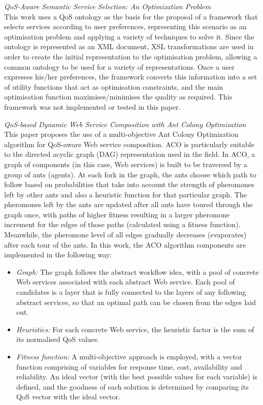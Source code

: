 \textit{QoS-Aware Semantic Service Selection: An Optimization Problem \cite{garcia2008qos}}\\
This work uses a QoS ontology as the basis for the proposal of a framework that selects services according to user preferences, representing this scenario as an optimisation problem and applying a variety of techniques to solve it. Since the ontology is represented as an XML document, XSL transformations are used in order to create the initial representation to the optimisation problem, allowing a common ontology to be used for a variety of representations. Once a user expresses his/her preferences, the framework converts this information into a set of utility functions that act as optimisation constraints, and the main optimisation function maximises/minimises the quality as required. This framework was not implemented or tested in this paper.

\textit{QoS-based Dynamic Web Service Composition with Ant Colony Optimization \cite{zhang2010qos}}\\
This paper proposes the use of a multi-objective Ant Colony Optimization algorithm for QoS-aware Web service
composition. ACO is particularly suitable to the directed acyclic graph (DAG) representation used in the field.
In ACO, a graph of components (in this case, Web services) is built to be traversed by a group of ants (agents).
At each fork in the graph, the ants choose which path to follow based on probabilities that take into account
the strength of pheromones left by other ants and also a heuristic function for that particular graph. The pheromones
left by the ants are updated after all ants have toured through the graph once, with paths of higher fitness
resulting in a larger pheromone increment for the edges of those paths (calculated using a fitness function).
Meanwhile, the pheromone level of all edges gradually decreases (evaporates) after each tour of the ants.
In this work, the ACO algorithm components are implemented in the following way:

\begin{itemize}
 \item \textit{Graph:} The graph follows the abstract workflow idea, with a pool of concrete Web services
 associated with each abstract Web service. Each pool of candidates is a layer that is fully connected to
 the layers of any following abstract services, so that an optimal path can be chosen from the edges laid
 out.
 \item \textit{Heuristics:} For each concrete Web service, the heuristic factor is the sum of its normalised
  QoS values.
 \item\textit{Fitness function:} A multi-objective approach is employed, with a vector function comprising of
 variables for response time, cost, availability and reliability. An ideal vector (with the best possible values
 for each variable) is defined, and the goodness of each solution is determined by comparing its QoS vector with
 the ideal vector.
\end{itemize}

